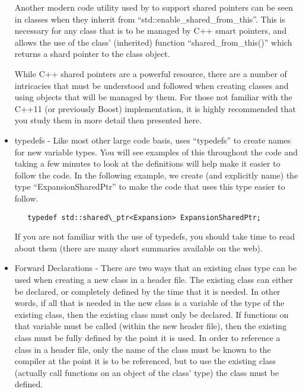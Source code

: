\begin{itemize}
  Another modern code utility used by {\nek} to support shared
  pointers can be seen in {\nek} classes when they inherit from
  ``std::enable\_shared\_from\_this''.  This is necessary for any
  class that is to be managed by C++ smart pointers, and allows the
  use of the class' (inherited) function ``shared\_from\_this()'' which
  returns a shard pointer to the class object.

  While C++ shared pointers are a powerful resource, there are a
  number of intricacies that must be understood and followed when
  creating classes and using objects that will be managed by them.
  For those not familiar with the C++11 (or previously Boost)
  implementation, it is highly recommended that you study them in more
  detail then presented here.
  
\item typedefs - Like most other large code basis, {\nek} uses
  ``typedefs'' to create names for new variable types.  You will
  see examples of this throughout the code and taking a few minutes to
  look at the definitions will help make it easier to follow the code.
  In the following example, we create (and explicitly name) the type
  ``ExpansionSharedPtr'' to make the code that uses this type easier
  to follow.

\begin{verbatim}
   typedef std::shared\_ptr<Expansion> ExpansionSharedPtr;
\end{verbatim}

  If you are not familiar with the use of typedefs, you should take
  time to read about them (there are many short summaries
  available on the web).

\item Forward Declarations - There are two ways that an existing class
  type can be used when creating a new class in a header file.  The
  existing class can either be declared, or completely defined by the
  time that it is needed.  In other words, if all that is needed in
  the new class is a variable of the type of the existing class, then
  the existing class must only be declared.  If functions on that
  variable must be called (within the new header file), then the
  existing class must be fully defined by the point it is used.  In
  order to reference a class in a header file, only the name of the
  class must be known to the compiler at the point it is to be
  referenced, but to use the existing class (actually call functions
  on an object of the class' type) the class must be defined. \\


\end{itemize}
